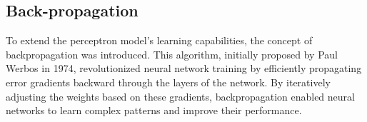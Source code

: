 \subsection{Back-propagation}

To extend the perceptron model's learning capabilities, the concept of backpropagation was introduced. This algorithm, initially proposed by Paul Werbos in 1974, revolutionized neural network training by efficiently propagating error gradients backward through the layers of the network. By iteratively adjusting the weights based on these gradients, backpropagation enabled neural networks to learn complex patterns and improve their performance.